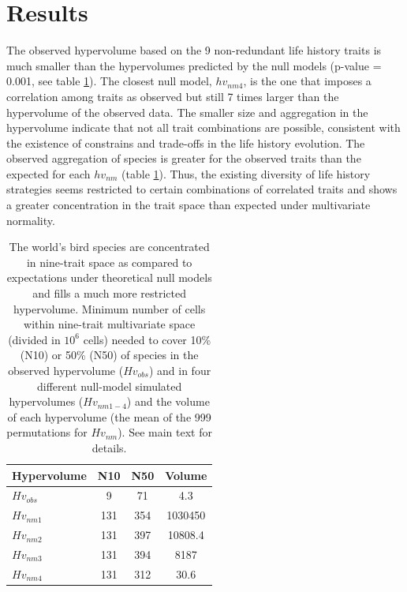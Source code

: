 \section{Results}

The observed hypervolume based on the 9 non-redundant life history traits is 
much smaller than the hypervolumes predicted by the null models (p-value = 
0.001, see table \ref{tab:table2.2}). The closest null model, $hv_{nm4}$, is 
the one that imposes a correlation among traits as observed but still 7 times 
larger than the hypervolume of the observed data. The smaller size and 
aggregation in the hypervolume indicate that not all trait combinations are 
possible, consistent with the existence of constrains and trade-offs in the life 
history evolution. The observed aggregation of species is greater for the 
observed traits than the expected for each $hv_{nm}$ (table 
\ref{tab:table2.2}). Thus, the existing diversity of life history strategies 
seems restricted to certain combinations of correlated traits and shows a 
greater concentration in the trait space than expected under multivariate 
normality.

\begin{table}
\center
\caption[Species' concentration and hypervolumes]{The world's bird species are
concentrated in nine-trait space as compared to expectations under theoretical
null models and fills a much more restricted hypervolume. Minimum number of 
cells within nine-trait multivariate space (divided in $10^{6}$ cells) needed to
cover 10\% (N10) or 50\% (N50) of species in the observed hypervolume 
($Hv_{obs}$) and in four different null-model simulated hypervolumes 
($Hv_{nm1-4}$) and the volume of each hypervolume (the mean of the 999 
permutations for $Hv_{nm}$). See main text for details.}
\label{tab:table2.2}
\begin{tabular}[b]{@{}lccc@{}}
\toprule
\textbf{Hypervolume} & \textbf{N10} & \textbf{N50} & \textbf{Volume} \\
\midrule
$Hv_{obs}$  & 9   & 71  & 4.3 \\
$Hv_{nm1}$  & 131 & 354 & 1030450 \\
$Hv_{nm2}$  & 131 & 397 & 10808.4 \\
$Hv_{nm3}$  & 131 & 394 & 8187 \\
$Hv_{nm4}$  & 131 & 312 & 30.6 \\
\bottomrule
\end{tabular}
\end{table}

